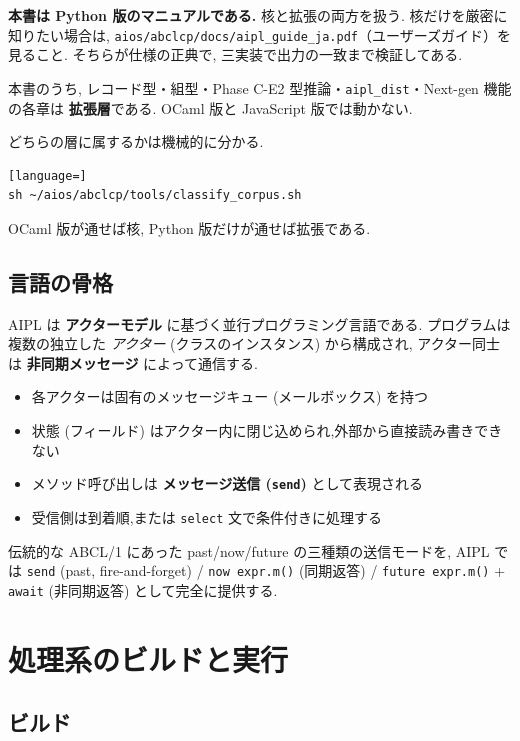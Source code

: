 \documentclass[11pt,a4paper]{article}
\begin{document}
\textbf{本書は Python 版のマニュアルである.} 核と拡張の両方を扱う.
核だけを厳密に知りたい場合は,
\texttt{aios/abclcp/docs/aipl\_guide\_ja.pdf}（ユーザーズガイド）を見ること.
そちらが仕様の正典で, 三実装で出力の一致まで検証してある.

本書のうち, レコード型・組型・Phase C-E2 型推論・\texttt{aipl\_dist}・Next-gen 機能の各章は
\textbf{拡張層}である. OCaml 版と JavaScript 版では動かない.

どちらの層に属するかは機械的に分かる.

\begin{lstlisting}[language=]
sh ~/aios/abclcp/tools/classify_corpus.sh
\end{lstlisting}

OCaml 版が通せば核, Python 版だけが通せば拡張である.

\subsection*{言語の骨格}

AIPL は \textbf{アクターモデル} に基づく並行プログラミング言語である.
プログラムは複数の独立した \emph{アクター} (クラスのインスタンス) から構成され,
アクター同士は \textbf{非同期メッセージ} によって通信する.

\begin{itemize}
  \item 各アクターは固有のメッセージキュー (メールボックス) を持つ
  \item 状態 (フィールド) はアクター内に閉じ込められ,外部から直接読み書きできない
  \item メソッド呼び出しは \textbf{メッセージ送信 (\texttt{send})} として表現される
  \item 受信側は到着順,または \texttt{select} 文で条件付きに処理する
\end{itemize}

伝統的な ABCL/1 にあった past/now/future の三種類の送信モードを,
AIPL では \texttt{send} (past, fire-and-forget) / \texttt{now expr.m()} (同期返答) /
\texttt{future expr.m()} + \texttt{await} (非同期返答) として完全に提供する.

\section{処理系のビルドと実行}

\subsection{ビルド}
\end{document}
